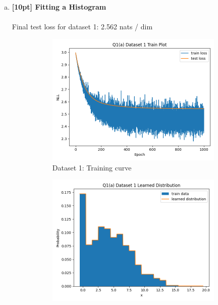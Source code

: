 \documentclass{article}
\begin{document}
\begin{enumerate}[(a)]

\item {\bf [10pt] Fitting a Histogram} \\\\
Final test loss for dataset 1: 2.562 nats / dim
\begin{figure}[H]
    \centering
    \begin{subfigure}{0.45\textwidth}
        \centering
        \includegraphics[width=\textwidth]{figures/q1_a_dset1_train_plot.png}
        \caption{Dataset 1: Training curve}
    \end{subfigure}
    \hspace{0.2in}
    \begin{subfigure}{0.45\textwidth}
        \centering
        \includegraphics[width=\textwidth]{figures/q1_a_dset1_learned_dist.png}

\end{subfigure}
\end{figure}
\end{enumerate}
\end{document}

